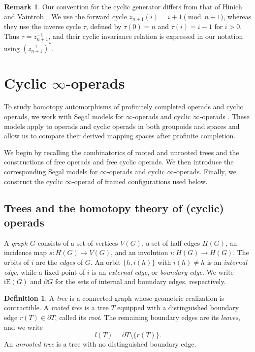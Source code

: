 \documentclass{amsart}
\theoremstyle{definition}
\newtheorem{definition}[theorem]{Definition}%
\newtheorem{remark}[theorem]{Remark}%
\numberwithin{equation}{section}
\begin{document}
\begin{remark}
\label{rem:Hinich-Vaintrob-cyclic-convention}
Our convention for the cyclic generator differs from that of Hinich and Vaintrob~\cite{hv_cyclic}. We use the forward cycle $z_{n+1}(i)=i+1\pmod{n+1}$, whereas they use the inverse cycle
$\tau$, defined by $\tau(0)=n$ and $\tau(i)=i-1$ for $i>0$. Thus $\tau=z_{n+1}^{-1}$, and their cyclic invariance relation is expressed in our notation using $(z_{n+1}^{-1})^*$.
\end{remark}


\section{Cyclic \texorpdfstring{$\infty$}{infinity}-operads}
\label{sec: cyclic infinity operad}

To study homotopy automorphisms of profinitely completed operads and
cyclic operads, we work with Segal models for $\infty$-operads and
cyclic $\infty$-operads \cite{cisinski2013dendroidal,hry1,doherty2025models}. These models
apply to operads and cyclic operads in both groupoids and spaces and
allow us to compare their derived mapping spaces after profinite
completion.

We begin by recalling the combinatorics of rooted and unrooted trees
and the constructions of free operads and free cyclic operads. We
then introduce the corresponding Segal models for $\infty$-operads
and cyclic $\infty$-operads. Finally, we construct the cyclic
$\infty$-operad of framed configurations used below.

\subsection{Trees and the homotopy theory of (cyclic) operads}
\label{subsec:trees}

A \emph{graph} $G$ consists of a set of vertices $V(G)$, a set of
half-edges $H(G)$, an incidence map $s\colon H(G)\to V(G)$, and an
involution $i\colon H(G)\to H(G)$. The orbits of $i$ are the
\emph{edges} of $G$. An orbit $\{h,i(h)\}$ with $i(h)\neq h$ is an
\emph{internal edge}, while a fixed point of $i$ is an
\emph{external edge}, or \emph{boundary edge}. We write
$\mathrm{iE}(G)$ and $\partial G$ for the sets of internal and
boundary edges, respectively.

\begin{definition}
A \emph{tree} is a connected graph whose geometric realization is
contractible. A \emph{rooted tree} is a tree $T$ equipped with a
distinguished boundary edge $r(T)\in\partial T$, called its
\emph{root}. The remaining boundary edges are its \emph{leaves}, and
we write
\[
l(T)=\partial T\setminus\{r(T)\}.
\]
An \emph{unrooted tree} is a tree with no distinguished boundary
edge.
\end{definition}
\end{document}
